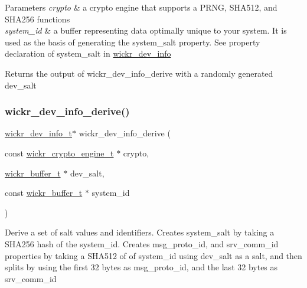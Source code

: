 \begin{DoxyParams}{Parameters}
{\em crypto} & a crypto engine that supports a P\+R\+NG, S\+H\+A512, and S\+H\+A256 functions \\
\hline
{\em system\+\_\+id} & a buffer representing data optimally unique to your system. It is used as the basis of generating the \textquotesingle{}system\+\_\+salt\textquotesingle{} property. See property declaration of \textquotesingle{}system\+\_\+salt\textquotesingle{} in \textquotesingle{}\mbox{\hyperlink{structwickr__dev__info}{wickr\+\_\+dev\+\_\+info}}\textquotesingle{} \\
\hline
\end{DoxyParams}
\begin{DoxyReturn}{Returns}
the output of \textquotesingle{}wickr\+\_\+dev\+\_\+info\+\_\+derive\textquotesingle{} with a randomly generated \textquotesingle{}dev\+\_\+salt\textquotesingle{} 
\end{DoxyReturn}
\mbox{\label{group__wickr__dev__info_ga7f81b96fc222560762d608772b3f44bd}} 
\subsubsection{\texorpdfstring{wickr\_dev\_info\_derive()}{wickr\_dev\_info\_derive()}}
{\footnotesize\ttfamily \mbox{\hyperlink{structwickr__dev__info}{wickr\+\_\+dev\+\_\+info\+\_\+t}}$\ast$ wickr\+\_\+dev\+\_\+info\+\_\+derive (\begin{DoxyParamCaption}\item[{const \mbox{\hyperlink{structwickr__crypto__engine}{wickr\+\_\+crypto\+\_\+engine\+\_\+t}} $\ast$}]{crypto,  }\item[{\mbox{\hyperlink{structwickr__buffer}{wickr\+\_\+buffer\+\_\+t}} $\ast$}]{dev\+\_\+salt,  }\item[{const \mbox{\hyperlink{structwickr__buffer}{wickr\+\_\+buffer\+\_\+t}} $\ast$}]{system\+\_\+id }\end{DoxyParamCaption})}

Derive a set of salt values and identifiers. Creates \textquotesingle{}system\+\_\+salt\textquotesingle{} by taking a S\+H\+A256 hash of the system\+\_\+id. Creates \textquotesingle{}msg\+\_\+proto\+\_\+id\textquotesingle{}, and \textquotesingle{}srv\+\_\+comm\+\_\+id\textquotesingle{} properties by taking a S\+H\+A512 of of \textquotesingle{}system\+\_\+id\textquotesingle{} using \textquotesingle{}dev\+\_\+salt\textquotesingle{} as a salt, and then splits by using the first 32 bytes as \textquotesingle{}msg\+\_\+proto\+\_\+id\textquotesingle{}, and the last 32 bytes as \textquotesingle{}srv\+\_\+comm\+\_\+id\textquotesingle{}


